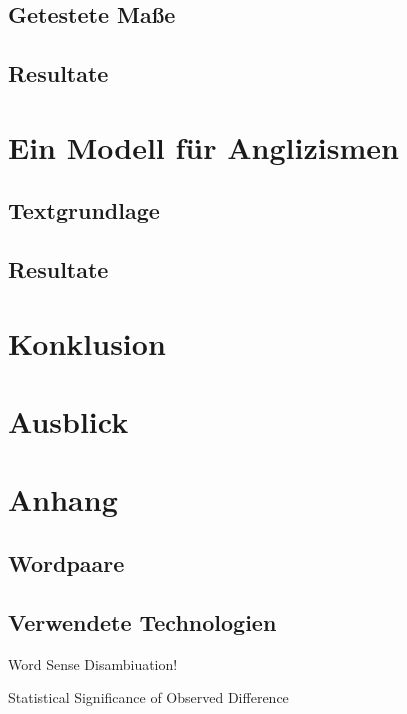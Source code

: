 \documentclass[11pt,numbers=noenddot]{scrartcl}
\begin{document}
\subsection{Getestete Maße}


\subsection{Resultate}

\section{Ein Modell für Anglizismen}

\subsection{Textgrundlage}


\subsection{Resultate}

\section{Konklusion}

\section{Ausblick}

\section{Anhang}

\subsection{Wordpaare}

\subsection{Verwendete Technologien}


Word Sense Disambiuation!

Statistical Significance of Observed Difference

\nocite{han2011}
\nocite{heyer2008}
\nocite{manning1999}


\end{document}
